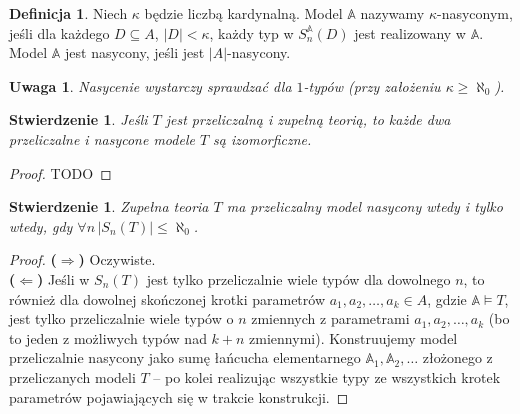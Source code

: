 \documentclass{article}
\newcommand{\A}{\mathbb{A}}
\theoremstyle{plain}
\newtheorem{stw}[thm]{Stwierdzenie}
\newtheorem{uw}[thm]{Uwaga}
\theoremstyle{definition}
\newtheorem{df}[thm]{Definicja}
\theoremstyle{remark}
\begin{document}
\begin{df}
	 Niech $\kappa$ będzie liczbą kardynalną.
	 Model $\A$ nazywamy $\kappa$-nasyconym, jeśli dla każdego $D \subseteq A$, $|D| < \kappa$, każdy typ w $S^{\A}_n(D)$ jest realizowany w $\A$.
	Model $\A$ jest nasycony, jeśli jest $|A|$-nasycony.
\end{df}

\begin{uw}
	Nasycenie wystarczy sprawdzać dla $1$-typów (przy założeniu $\kappa \geq \aleph_0$).
\end{uw}

\begin{stw}
	 Jeśli $T$ jest przeliczalną i zupełną teorią, to każde dwa przeliczalne i nasycone modele $T$ są izomorficzne.
\end{stw}
\begin{proof}
	 TODO
\end{proof}
\begin{stw}
	Zupełna teoria $T$ ma przeliczalny model nasycony wtedy i tylko wtedy, gdy $\forall n \,|S_n(T)| \leq \aleph_0$.
\end{stw}
\begin{proof}
	 \textbf{($\Rightarrow$)} Oczywiste.
	 \\\textbf{($\Leftarrow$)} Jeśli w $S_n(T)$ jest tylko przeliczalnie wiele typów dla dowolnego $n$, to również dla dowolnej skończonej krotki parametrów $a_1, a_2, \ldots, a_k \in A$, gdzie $\A \models T$, jest tylko przeliczalnie wiele typów o $n$ zmiennych z parametrami $a_1, a_2, \ldots, a_k$ (bo to jeden z możliwych typów nad $k+n$ zmiennymi).
	 Konstruujemy model przeliczalnie nasycony jako sumę łańcucha elementarnego $\A_1, \A_2, \ldots$ złożonego z przeliczanych modeli $T$ -- po kolei realizując wszystkie typy ze wszystkich krotek parametrów pojawiających się w trakcie konstrukcji.

\end{proof}
\end{document}
